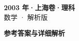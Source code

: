 \documentclass[zihao=-4, a4paper]{ctexart}
\begin{document}
\begin{center}
  {\Large\bfseries 2003 年·上海卷·理科}\\[4pt]
  {\large 数学 · 解析版}
\end{center}
\medskip
{}

\clearpage
{}
\begin{center}{\Large\bfseries 参考答案与详细解析}\end{center}
\medskip

\end{document}

